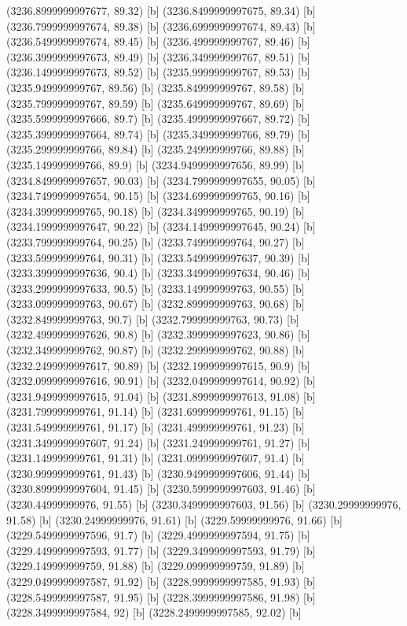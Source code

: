 {{{(3236.8999999997677, 89.32) [b] 
(3236.8499999997675, 89.34) [b] 
(3236.7999999997674, 89.38) [b] 
(3236.6999999997674, 89.43) [b] 
(3236.5499999997674, 89.45) [b] 
(3236.499999999767, 89.46) [b] 
(3236.3999999997673, 89.49) [b] 
(3236.349999999767, 89.51) [b] 
(3236.1499999997673, 89.52) [b] 
(3235.999999999767, 89.53) [b] 
(3235.949999999767, 89.56) [b] 
(3235.849999999767, 89.58) [b] 
(3235.799999999767, 89.59) [b] 
(3235.649999999767, 89.69) [b] 
(3235.5999999997666, 89.7) [b] 
(3235.4999999997667, 89.72) [b] 
(3235.3999999997664, 89.74) [b] 
(3235.349999999766, 89.79) [b] 
(3235.299999999766, 89.84) [b] 
(3235.249999999766, 89.88) [b] 
(3235.149999999766, 89.9) [b] 
(3234.9499999997656, 89.99) [b] 
(3234.8499999997657, 90.03) [b] 
(3234.7999999997655, 90.05) [b] 
(3234.7499999997654, 90.15) [b] 
(3234.699999999765, 90.16) [b] 
(3234.399999999765, 90.18) [b] 
(3234.349999999765, 90.19) [b] 
(3234.1999999997647, 90.22) [b] 
(3234.1499999997645, 90.24) [b] 
(3233.799999999764, 90.25) [b] 
(3233.749999999764, 90.27) [b] 
(3233.599999999764, 90.31) [b] 
(3233.5499999997637, 90.39) [b] 
(3233.3999999997636, 90.4) [b] 
(3233.3499999997634, 90.46) [b] 
(3233.2999999997633, 90.5) [b] 
(3233.149999999763, 90.55) [b] 
(3233.099999999763, 90.67) [b] 
(3232.899999999763, 90.68) [b] 
(3232.849999999763, 90.7) [b] 
(3232.799999999763, 90.73) [b] 
(3232.4999999997626, 90.8) [b] 
(3232.3999999997623, 90.86) [b] 
(3232.349999999762, 90.87) [b] 
(3232.299999999762, 90.88) [b] 
(3232.2499999997617, 90.89) [b] 
(3232.1999999997615, 90.9) [b] 
(3232.0999999997616, 90.91) [b] 
(3232.0499999997614, 90.92) [b] 
(3231.9499999997615, 91.04) [b] 
(3231.8999999997613, 91.08) [b] 
(3231.799999999761, 91.14) [b] 
(3231.699999999761, 91.15) [b] 
(3231.549999999761, 91.17) [b] 
(3231.499999999761, 91.23) [b] 
(3231.3499999997607, 91.24) [b] 
(3231.249999999761, 91.27) [b] 
(3231.149999999761, 91.31) [b] 
(3231.0999999997607, 91.4) [b] 
(3230.999999999761, 91.43) [b] 
(3230.9499999997606, 91.44) [b] 
(3230.8999999997604, 91.45) [b] 
(3230.5999999997603, 91.46) [b] 
(3230.44999999976, 91.55) [b] 
(3230.3499999997603, 91.56) [b] 
(3230.29999999976, 91.58) [b] 
(3230.24999999976, 91.61) [b] 
(3229.59999999976, 91.66) [b] 
(3229.5499999997596, 91.7) [b] 
(3229.4999999997594, 91.75) [b] 
(3229.4499999997593, 91.77) [b] 
(3229.3499999997593, 91.79) [b] 
(3229.149999999759, 91.88) [b] 
(3229.099999999759, 91.89) [b] 
(3229.0499999997587, 91.92) [b] 
(3228.9999999997585, 91.93) [b] 
(3228.5499999997587, 91.95) [b] 
(3228.3999999997586, 91.98) [b] 
(3228.3499999997584, 92) [b] 
(3228.2499999997585, 92.02) [b] 
}}}
